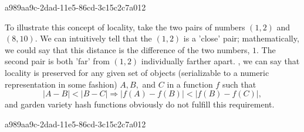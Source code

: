 \documentclass[12pt]{article}
\begin{document}
a989aa9c-2dad-11e5-86cd-3c15c2c7a012\par To illustrate this concept of locality, take the two pairs of numbers $(1,2)$ and $(8,10)$. We can intuitively tell that the $(1,2)$ is a 'close' pair; mathematically, we could say that this distance is the difference of the two numbers, $1$. The second pair is both 'far' from $(1,2)$ individually farther apart. , we can say that locality is preserved for any given set of objects (serializable to a numeric representation in some fashion) $A,B,$ and $C$ in a function $f$ such that
\begin{equation}
|A-B| < |B-C| \Rightarrow |f(A)-f(B)| < |f(B) - f(C)|,
\end{equation}
and garden variety hash functions obviously do not fulfill this requirement.

\printbibliography
a989aa9c-2dad-11e5-86cd-3c15c2c7a012
\end{document}
